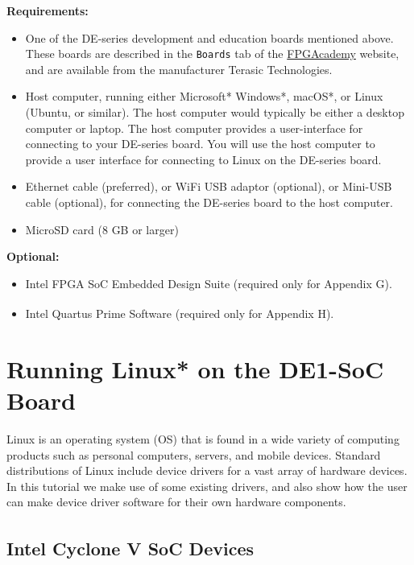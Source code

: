 \documentclass[11pt, twoside, pdftex]{article}
\begin{document}
{\bf Requirements:}
\begin{itemize}
\item One of the DE-series development and education boards mentioned above. These boards are 
described in the \texttt{Boards} tab of the {\small \href{https://www.fpgacademy.org/boards.html}
{FPGAcademy}} website, 
and are available from the manufacturer Terasic Technologies.

\item Host computer, running either Microsoft* Windows*, macOS*, or Linux 
(Ubuntu, or similar). The host computer would typically be either a
desktop computer or laptop. The host computer provides a user-interface for connecting to
your DE-series board. You will use the host computer to provide a user interface for connecting
to Linux on the DE-series board.

\item Ethernet cable (preferred), or WiFi USB adaptor (optional), or Mini-USB cable (optional), 
for connecting the DE-series board to the host computer. 

\item MicroSD card (8 GB or larger)
\end{itemize}

{\bf Optional:}
\begin{itemize}
\item Intel FPGA SoC Embedded Design Suite (required only for Appendix G).
\item Intel Quartus\textsuperscript{\textregistered} Prime Software (required only for 
Appendix H).
\end{itemize}

\section{Running Linux* on the DE1-SoC Board}

Linux is an operating system (OS) that is found in a wide variety of computing products such 
as personal computers, servers, and mobile devices. Standard distributions of Linux 
include device drivers for a vast array of hardware devices. In this tutorial we make use of 
some existing drivers, and also show how the user can make device driver software
for their own hardware components. 

\subsection{Intel Cyclone\textsuperscript{\textregistered} V SoC Devices}
\end{document}
